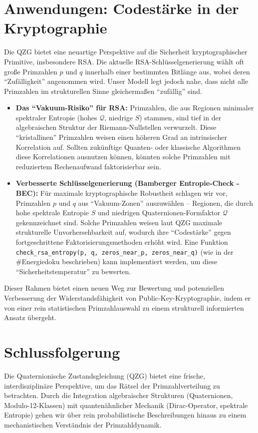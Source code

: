 \documentclass[11pt,a4paper]{article}
\newcommand{\entropy}{S}
\newcommand{\formfactor}{\mathcal{Q}}
\theoremstyle{definition}
\begin{document}
\section{Anwendungen: Codestärke in der Kryptographie}
\label{sec:applications_de}
Die QZG bietet eine neuartige Perspektive auf die Sicherheit kryptographischer Primitive, insbesondere RSA. Die aktuelle RSA-Schlüsselgenerierung wählt oft große Primzahlen $p$ und $q$ innerhalb einer bestimmten Bitlänge aus, wobei deren ``Zufälligkeit'' angenommen wird. Unser Modell legt jedoch nahe, dass nicht alle Primzahlen im strukturellen Sinne gleichermaßen ``zufällig'' sind.

\begin{itemize}
    \item \textbf{Das ``Vakuum-Risiko'' für RSA:} Primzahlen, die aus Regionen minimaler spektraler Entropie (hohes $\formfactor$, niedrige $\entropy$) stammen, sind tief in der algebraischen Struktur der Riemann-Nullstellen verwurzelt. Diese ``kristallinen'' Primzahlen weisen einen höheren Grad an intrinsischer Korrelation auf. Sollten zukünftige Quanten- oder klassische Algorithmen diese Korrelationen ausnutzen können, könnten solche Primzahlen mit reduziertem Rechenaufwand faktorisierbar sein.
    \item \textbf{Verbesserte Schlüsselgenerierung (Bamberger Entropie-Check - BEC):} Für maximale kryptographische Robustheit schlagen wir vor, Primzahlen $p$ und $q$ aus ``Vakuum-Zonen'' auszuwählen -- Regionen, die durch hohe spektrale Entropie $\entropy$ und niedrigen Quaternionen-Formfaktor $\formfactor$ gekennzeichnet sind. Solche Primzahlen weisen laut QZG maximale strukturelle Unvorhersehbarkeit auf, wodurch ihre ``Codestärke'' gegen fortgeschrittene Faktorisierungsmethoden erhöht wird. Eine Funktion \texttt{check\_rsa\_entropy(p, q, zeros\_near\_p, zeros\_near\_q)} (wie in der \#Energiedoku beschrieben) kann implementiert werden, um diese ``Sicherheitstemperatur'' zu bewerten.
\end{itemize}
Dieser Rahmen bietet einen neuen Weg zur Bewertung und potenziellen Verbesserung der Widerstandsfähigkeit von Public-Key-Kryptographie, indem er von einer rein statistischen Primzahlauswahl zu einem strukturell informierten Ansatz übergeht.

\section{Schlussfolgerung}
\label{sec:conclusion_de}
Die Quaternionische Zustandsgleichung (QZG) bietet eine frische, interdisziplinäre Perspektive, um das Rätsel der Primzahlverteilung zu betrachten. Durch die Integration algebraischer Strukturen (Quaternionen, Modulo-12-Klassen) mit quantenähnlicher Mechanik (Dirac-Operator, spektrale Entropie) gehen wir über rein probabilistische Beschreibungen hinaus zu einem mechanistischen Verständnis der Primzahldynamik.
\end{document}
